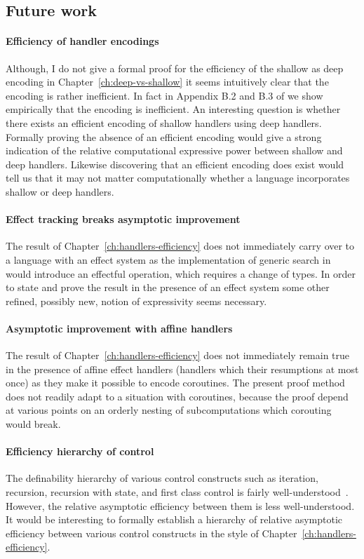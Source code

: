 \documentclass[12pt,phd,lfcs,twoside,openright,logo,leftchapter,normalheadings]{infthesis}
\theoremstyle{plain}
\theoremstyle{definition}
\begin{document}
\subsection{Future work}

\paragraph{Efficiency of handler encodings} Although, I do not give a
formal proof for the efficiency of the shallow as deep encoding in
Chapter~\ref{ch:deep-vs-shallow} it seems intuitively clear that the
encoding is rather inefficient. In fact in Appendix B.2 and B.3 of
\citet{HillerstromL18} we show empirically that the encoding is
inefficient. An interesting question is whether there exists an
efficient encoding of shallow handlers using deep handlers. Formally
proving the absence of an efficient encoding would give a strong
indication of the relative computational expressive power between
shallow and deep handlers. Likewise discovering that an efficient
encoding does exist would tell us that it may not matter
computationally whether a language incorporates shallow or deep
handlers.

\paragraph{Effect tracking breaks asymptotic improvement} The
result of Chapter~\ref{ch:handlers-efficiency} does not immediately
carry over to a language with an effect system as the implementation
of generic search in \HPCF{} would introduce an effectful operation,
which requires a change of types. In order to state and prove the
result in the presence of an effect system some other refined,
possibly new, notion of expressivity seems necessary.

\paragraph{Asymptotic improvement with affine handlers}
The result of Chapter~\ref{ch:handlers-efficiency} does not
immediately remain true in the presence of affine effect handlers
(handlers which their resumptions at most once) as they make it
possible to encode coroutines. The present proof method does not
readily adapt to a situation with coroutines, because the proof depend
at various points on an orderly nesting of subcomputations which
corouting would break.

\paragraph{Efficiency hierarchy of control} The definability hierarchy
of various control constructs such as iteration, recursion, recursion
with state, and first class control is fairly
well-understood~\cite{LongleyN15,Longley18a,Longley19}. However, the
relative asymptotic efficiency between them is less
well-understood. It would be interesting to formally establish a
hierarchy of relative asymptotic efficiency between various control
constructs in the style of Chapter~\ref{ch:handlers-efficiency}.
\end{document}
